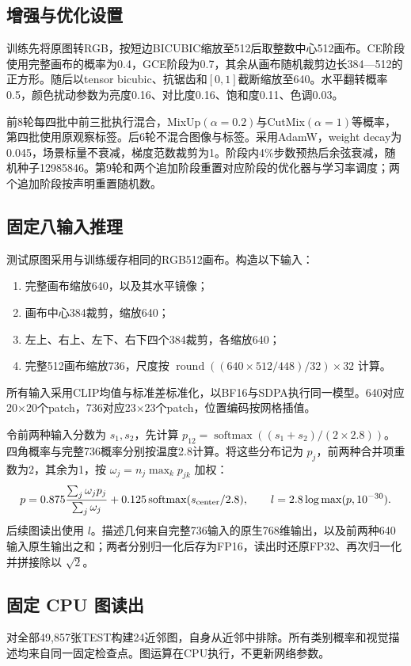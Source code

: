 \documentclass[UTF8,fontset=none,zihao=-4]{ctexart}
\newcommand{\sm}{\operatorname{softmax}}
\begin{document}
\subsection*{增强与优化设置}
训练先将原图转RGB，按短边BICUBIC缩放至512后取整数中心512画布。CE阶段使用完整画布的概率为0.4，GCE阶段为0.7，其余从画布随机裁剪边长384—512的正方形。随后以tensor bicubic、抗锯齿和$[0,1]$截断缩放至640。水平翻转概率0.5，颜色扰动参数为亮度0.16、对比度0.16、饱和度0.11、色调0.03。

前8轮每四批中前三批执行混合，MixUp$(\alpha=0.2)$与CutMix$(\alpha=1)$等概率，第四批使用原观察标签。后6轮不混合图像与标签。采用AdamW，weight decay为0.045，场景标量不衰减，梯度范数裁剪为1。阶段内4\%步数预热后余弦衰减，随机种子12985846。第9轮和两个追加阶段重置对应阶段的优化器与学习率调度；两个追加阶段按声明重置随机数。

\subsection*{固定八输入推理}
测试原图采用与训练缓存相同的RGB512画布。构造以下输入：
\begin{enumerate}
\item 完整画布缩放640，以及其水平镜像；
\item 画布中心384裁剪，缩放640；
\item 左上、右上、左下、右下四个384裁剪，各缩放640；
\item 完整512画布缩放736，尺度按 $\operatorname{round}((640\times512/448)/32)\times32$ 计算。
\end{enumerate}
所有输入采用CLIP均值与标准差标准化，以BF16与SDPA执行同一模型。640对应20×20个patch，736对应23×23个patch，位置编码按网格插值。

令前两种输入分数为 $s_1,s_2$，先计算 $p_{12}=\sm((s_1+s_2)/(2\times2.8))$。四角概率与完整736概率分别按温度2.8计算。将这些分布记为 $p_j$，前两种合并项重数为2，其余为1，按 $\omega_j=n_j\max_k p_{jk}$ 加权：
\[
p=0.875\frac{\sum_j\omega_jp_j}{\sum_j\omega_j}
+0.125\sm(s_{\rm center}/2.8),\qquad l=2.8\log\max(p,10^{-30}).
\]
后续图读出使用 $l$。描述几何来自完整736输入的原生768维输出，以及前两种640输入原生输出之和；两者分别归一化后存为FP16，读出时还原FP32、再次归一化并拼接除以 $\sqrt2$。

\subsection*{固定 CPU 图读出}
对全部49,857张TEST构建24近邻图，自身从近邻中排除。所有类别概率和视觉描述均来自同一固定检查点。图运算在CPU执行，不更新网络参数。
\end{document}
